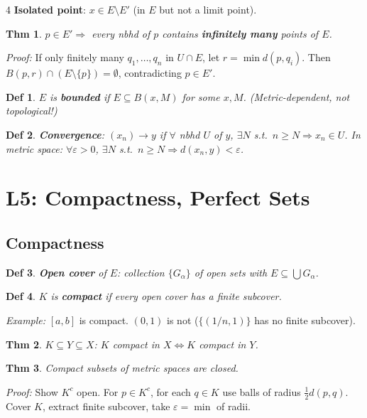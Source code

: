 \documentclass[9pt,landscape]{extarticle}
\newcommand{\eps}{\varepsilon}
\theoremstyle{compact}
\newtheorem*{thm}{Thm}
\newtheorem*{defn}{Def}
\begin{document}
\begin{multicols}{4}
\textbf{Isolated point}: $x \in E \setminus E'$ (in $E$ but not a limit point).

\begin{thm}
$p \in E' \Rightarrow$ every nbhd of $p$ contains \textbf{infinitely many} points of $E$.
\end{thm}
\textit{Proof:} If only finitely many $q_1, \ldots, q_n$ in $U \cap E$, let $r = \min d(p,q_i)$. Then $B(p,r) \cap (E \setminus \{p\}) = \emptyset$, contradicting $p \in E'$.

\begin{defn}
$E$ is \textbf{bounded} if $E \subseteq B(x,M)$ for some $x, M$. (Metric-dependent, not topological!)
\end{defn}

\begin{defn}
\textbf{Convergence}: $(x_n) \to y$ if $\forall$ nbhd $U$ of $y$, $\exists N$ s.t.\ $n \geq N \Rightarrow x_n \in U$. In metric space: $\forall \eps > 0$, $\exists N$ s.t.\ $n \geq N \Rightarrow d(x_n, y) < \eps$.
\end{defn}

\section{L5: Compactness, Perfect Sets}

\subsection{Compactness}
\begin{defn}
\textbf{Open cover} of $E$: collection $\{G_\alpha\}$ of open sets with $E \subseteq \bigcup G_\alpha$.
\end{defn}

\begin{defn}
$K$ is \textbf{compact} if every open cover has a finite subcover.
\end{defn}

\textit{Example:} $[a,b]$ is compact. $(0,1)$ is not ($\{(1/n,1)\}$ has no finite subcover).

\begin{thm}
$K \subseteq Y \subseteq X$: $K$ compact in $X \Leftrightarrow K$ compact in $Y$.
\end{thm}

\begin{thm}
Compact subsets of metric spaces are closed.
\end{thm}
\textit{Proof:} Show $K^c$ open. For $p \in K^c$, for each $q \in K$ use balls of radius $\frac{1}{2}d(p,q)$. Cover $K$, extract finite subcover, take $\eps = \min$ of radii.


\end{multicols}
\end{document}
